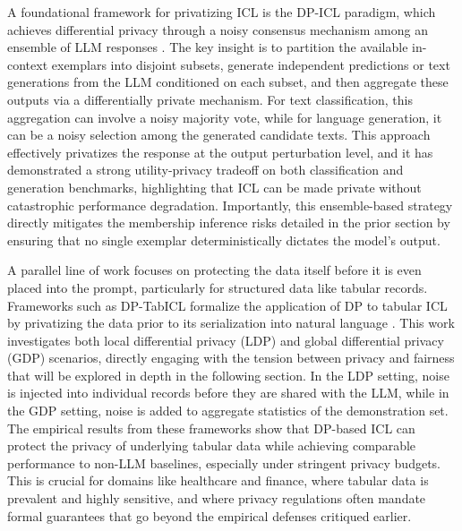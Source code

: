 \documentclass[11pt]{article}
\begin{document}
A foundational framework for privatizing ICL is the DP-ICL paradigm, which achieves differential privacy through a noisy consensus mechanism among an ensemble of LLM responses \cite{ref454}. The key insight is to partition the available in-context exemplars into disjoint subsets, generate independent predictions or text generations from the LLM conditioned on each subset, and then aggregate these outputs via a differentially private mechanism. For text classification, this aggregation can involve a noisy majority vote, while for language generation, it can be a noisy selection among the generated candidate texts. This approach effectively privatizes the response at the output perturbation level, and it has demonstrated a strong utility-privacy tradeoff on both classification and generation benchmarks, highlighting that ICL can be made private without catastrophic performance degradation. Importantly, this ensemble-based strategy directly mitigates the membership inference risks detailed in the prior section by ensuring that no single exemplar deterministically dictates the model's output.

A parallel line of work focuses on protecting the data itself before it is even placed into the prompt, particularly for structured data like tabular records. Frameworks such as DP-TabICL formalize the application of DP to tabular ICL by privatizing the data prior to its serialization into natural language \cite{ref455}. This work investigates both local differential privacy (LDP) and global differential privacy (GDP) scenarios, directly engaging with the tension between privacy and fairness that will be explored in depth in the following section. In the LDP setting, noise is injected into individual records before they are shared with the LLM, while in the GDP setting, noise is added to aggregate statistics of the demonstration set. The empirical results from these frameworks show that DP-based ICL can protect the privacy of underlying tabular data while achieving comparable performance to non-LLM baselines, especially under stringent privacy budgets. This is crucial for domains like healthcare and finance, where tabular data is prevalent and highly sensitive, and where privacy regulations often mandate formal guarantees that go beyond the empirical defenses critiqued earlier.
\end{document}
